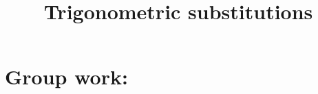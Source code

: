 \documentclass[]{ximera}
\title{Trigonometric substitutions}
\begin{document}
\begin{abstract}		\end{abstract}
\maketitle



\begin{comment}
\section{Warm up:}

	\begin{freeResponse}
	
	\end{freeResponse}
	
\begin{instructorNotes}

\end{instructorNotes}
\end{comment}







\section{Group work:}
\end{document}
